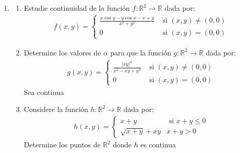 \documentclass[letterpaper,11pt]{article}
\begin{document}
\begin{enumerate}
\begin{enumerate}
    \end{enumerate}
\item 
    \begin{enumerate}
        \item Estudie continuidad de la función $f: \mathbb{R}^2\rightarrow\mathbb{R}$ dada por:
        \begin{align*}
            f(x,y)=\left\{
            \begin{array}{cl}
            \displaystyle\frac{x\cos{y}-y\cos{x}-x+y}{x^2+y^2}& \text{ si } (x,y)\neq(0,0) \\
            0 & \text{ si } (x,y)=(0,0)
            \end{array} \right.
        \end{align*}
        
        \item Determine los valores de $\alpha$ para que la función $g : \mathbb{R}^2\rightarrow\mathbb{R}$ dada por:
            \begin{align*}
                g(x,y)=\left\{
                \begin{array}{cl}
                \displaystyle \frac{|xy|^{\alpha}}{x^2-xy+y^2}&  \text{ si } (x,y)\neq(0,0) \\
                0 &  \text{ si } (x,y)=(0,0)
                \end{array}
                \right.
            \end{align*}
            Sea continua
        \item Considere la función $h: \mathbb{R}^2\rightarrow\mathbb{R}$ dada por:
        \begin{align*}
            h(x,y)=\left\{
            \begin{array}{cl}
            x+y &\text{ si } x+y\leq0  \\
            \sqrt{x+y}+xy& x+y>0
            \end{array}\right.
        \end{align*}
        Determine los puntos de $\mathbb{R}^2$ donde $h$ es continua
        
    \end{enumerate}
\end{enumerate}
\end{document}
